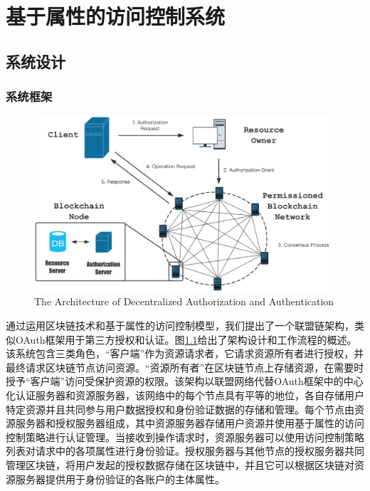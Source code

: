 
\chapter{基于属性的访问控制系统}

\section{系统设计}

\subsection{系统框架}
\begin{figure}
\centering
\includegraphics[width=11cm]{figures/archi.eps}
\caption{The Architecture of Decentralized Authorization and Authentication}
\label{fig:framework}
\end{figure}

通过运用区块链技术和基于属性的访问控制模型，我们提出了一个联盟链架构，类似OAuth框架用于第三方授权和认证。图\ref{fig:framework}给出了架构设计和工作流程的概述。该系统包含三类角色，“客户端”作为资源请求者，它请求资源所有者进行授权，并最终请求区块链节点访问资源。“资源所有者”在区块链节点上存储资源，在需要时授予“客户端”访问受保护资源的权限。该架构以联盟网络代替OAuth框架中的中心化认证服务器和资源服务器，该网络中的每个节点具有平等的地位，各自存储用户特定资源并且共同参与用户数据授权和身份验证数据的存储和管理。每个节点由资源服务器和授权服务器组成，其中资源服务器存储用户资源并使用基于属性的访问控制策略进行认证管理。当接收到操作请求时，资源服务器可以使用访问控制策略列表对请求中的各项属性进行身份验证。授权服务器与其他节点的授权服务器共同管理区块链，将用户发起的授权数据存储在区块链中，并且它可以根据区块链对资源服务器提供用于身份验证的各账户的主体属性。

